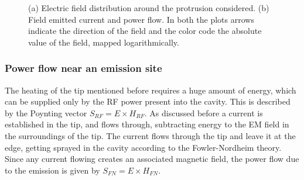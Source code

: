  \begin{figure}
 \centering
 \hspace{5mm}
 \caption{(a) Electric field distribution around the protrusion considered. (b) Field emitted current and power flow. In both the plots arrows indicate the direction of the field and the color code the absolute value of the field, mapped logarithmically.\cite{Grudiev:newLoc} }
 \label{figure_S_c}
 
 \end{figure}



\subsubsection{Power flow near an emission site}

The heating of the tip mentioned before requires a huge amount of energy, which can be supplied only by the RF power present into the cavity. This is described by the Poynting vector $S_{RF} = E\times H_{RF}$. As discussed before a current is established in the tip, and flows through, subtracting energy to the EM field in the surroundings of the tip. The current flows through the tip and leave it at the edge, getting sprayed in the cavity according to the Fowler-Nordheim theory. Since any current flowing creates an associated magnetic field, the power flow due to the emission is given by $S_{FN}=E\times H_{FN}$. 

